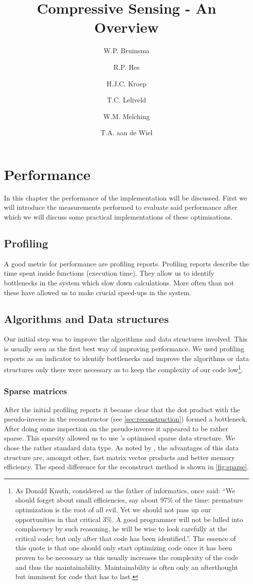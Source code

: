 \documentclass[a4paper, openany, oneside]{memoir}
\title{Compressive Sensing - An Overview}
\author{W.P. Bruinsma \and R.P. Hes \and H.J.C. Kroep \and T.C. Leliveld \and W.M. Melching \and T.A. aan de Wiel}
\begin{document}
\chapter{Performance}
\label{cha:performance}
In this chapter the performance of the implementation will be discussed. First we will introduce the measurements performed to evaluate said performance after which we will discuss some practical implementations of these optimisations.

\section{Profiling}
\label{sec:performance-profiling}
A good metric for performance are profiling reports. Profiling reports describe the time spent inside functions (execution time). They allow us to identify bottlenecks in the system which slow down calculations. More often than not these have allowed us to make crucial speed-ups in the system.

\section{Algorithms and Data structures}
Our initial step was to improve the algorithms and data structures involved. This is usually seen as the first best way of improving performance. We used profiling reports as an indicator to identify bottlenecks and improve the algorithms or data structures only there were necessary as to keep the complexity of our code low\footnote{As Donald Knuth, considered as the father of informatics, once said: ``We should forget about small efficiencies, say about 97\% of the time: premature optimization is the root of all evil. Yet we should not pass up our opportunities in that critical 3\%. A good programmer will not be lulled into complacency by such reasoning, he will be wise to look carefully at the critical code; but only after that code has been identified.''\cite{knuth1974structured}. The essence of this quote is that one should only start optimizing code once it has been proven to be necessary as this usually increases the complexity of the code and thus the maintainability. Maintainability is often only an afterthought but imminent for code that has to last.}.

\subsection{Sparse matrices}
\label{sec:sparse-matrices}
After the initial profiling reports it became clear that the dot product with the pseudo-inverse in the reconstructor (see \cref{sec:reconstruction}) formed a bottleneck. After doing some inspection on the pseudo-inverse it appeared to be rather sparse. This sparsity allowed us to use 's optimised sparse data structure. We chose the rather standard  data type. As noted by \cite{numpyscipy}, the advantages of this data structure are, amongst other, fast matrix vector products and better memory efficiency. The speed difference for the reconstruct method is shown in \cref{fig:sparse}.
\end{document}
